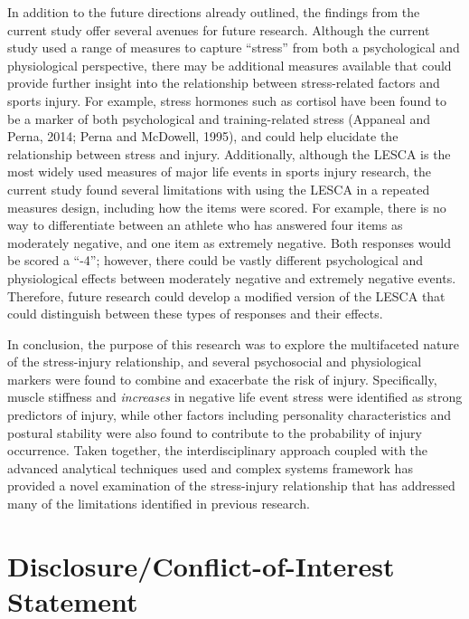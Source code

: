 \documentclass[
]{frontiersHLTH}
\begin{document}
In addition to the future directions already outlined, the findings from
the current study offer several avenues for future research. Although
the current study used a range of measures to capture ``stress'' from
both a psychological and physiological perspective, there may be
additional measures available that could provide further insight into
the relationship between stress-related factors and sports injury. For
example, stress hormones such as cortisol have been found to be a marker
of both psychological and training-related stress (Appaneal and Perna,
2014; Perna and McDowell, 1995), and could help elucidate the
relationship between stress and injury. Additionally, although the LESCA
is the most widely used measures of major life events in sports injury
research, the current study found several limitations with using the
LESCA in a repeated measures design, including how the items were
scored. For example, there is no way to differentiate between an athlete
who has answered four items as moderately negative, and one item as
extremely negative. Both responses would be scored a ``-4''; however,
there could be vastly different psychological and physiological effects
between moderately negative and extremely negative events. Therefore,
future research could develop a modified version of the LESCA that could
distinguish between these types of responses and their effects.

In conclusion, the purpose of this research was to explore the
multifaceted nature of the stress-injury relationship, and several
psychosocial and physiological markers were found to combine and
exacerbate the risk of injury. Specifically, muscle stiffness and
\emph{increases} in negative life event stress were identified as strong
predictors of injury, while other factors including personality
characteristics and postural stability were also found to contribute to
the probability of injury occurrence. Taken together, the
interdisciplinary approach coupled with the advanced analytical
techniques used and complex systems framework has provided a novel
examination of the stress-injury relationship that has addressed many of
the limitations identified in previous research.

\hypertarget{disclosureconflict-of-interest-statement}{%
\section{Disclosure/Conflict-of-Interest
Statement}\label{disclosureconflict-of-interest-statement}}
\end{document}
